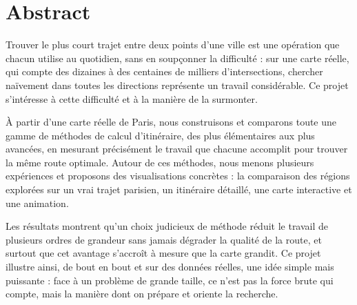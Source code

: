 \chapter*{\center \Large Abstract}

\noindent
Trouver le plus court trajet entre deux points d'une ville est une opération que
chacun utilise au quotidien, sans en soupçonner la difficulté : sur une carte
réelle, qui compte des dizaines à des centaines de milliers d'intersections,
chercher naïvement dans toutes les directions représente un travail considérable.
Ce projet s'intéresse à cette difficulté et à la manière de la surmonter.

\medskip
\noindent
À partir d'une carte réelle de Paris, nous construisons et comparons toute une
gamme de méthodes de calcul d'itinéraire, des plus élémentaires aux plus
avancées, en mesurant précisément le travail que chacune accomplit pour trouver
la même route optimale. Autour de ces méthodes, nous menons plusieurs
expériences et proposons des visualisations concrètes : la comparaison des
régions explorées sur un vrai trajet parisien, un itinéraire détaillé, une carte
interactive et une animation.

\medskip
\noindent
Les résultats montrent qu'un choix judicieux de méthode réduit le travail de
plusieurs ordres de grandeur sans jamais dégrader la qualité de la route, et
surtout que cet avantage s'accroît à mesure que la carte grandit. Ce projet
illustre ainsi, de bout en bout et sur des données réelles, une idée simple mais
puissante : face à un problème de grande taille, ce n'est pas la force brute qui
compte, mais la manière dont on prépare et oriente la recherche.
